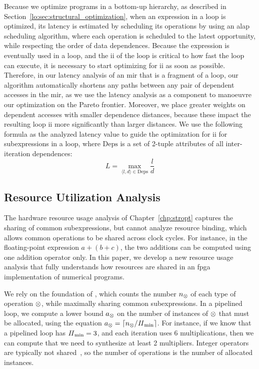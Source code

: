 Because we optimize programs in a bottom-up hierarchy, as described in
Section~\ref{lo:sec:structural_optimization}, when an expression in a loop
is optimized, its latency is estimated by scheduling its operations by using
an \gls{alap}~\cite{wang_hls} scheduling algorithm, where each operation
is scheduled to the latest opportunity, while respecting the order of data
dependences.  Because the expression is eventually used in a loop, and the
\gls{ii} of the loop is critical to how fast the loop can execute, it is
necessary to start optimizing for \gls{ii} as soon as possible. Therefore,
in our latency analysis of an \gls{mir} that is a fragment of a loop, our
algorithm automatically shortens any paths between any pair of dependent
accesses in the \gls{mir}\@, as we use the latency analysis as a component to
manoeuvre our optimization on the Pareto frontier.  Moreover, we place greater
weights on dependent accesses with smaller dependence distances, because these
impact the resulting loop \gls{ii} more significantly than larger distances.
We use the following formula as the analyzed latency value to guide the
optimization for \gls{ii} for subexpressions in a loop, where $\mathrm{Deps}$
is a set of 2-tuple attributes of all inter-iteration dependences:
\begin{equation}
    L = \max_{\langle l, d \rangle \in \mathrm{Deps}} \frac{l}{d}
\end{equation}

\subsection{Resource Utilization Analysis}
\label{lo:sub:resource_utilization_analysis}

The hardware resource usage analysis of Chapter~\ref{chp:stropt} captures the
sharing of common subexpressions, but cannot analyze resource binding, which
allows common operations to be shared across clock cycles. For instance, in
the floating-point expression $a + (b + c)$, the two additions can be computed
using one addition operator only. In this paper, we develop a new resource
usage analysis that fully understands how resources are shared in an \gls{fpga}
implementation of numerical programs.

We rely on the foundation of \soap{}, which counts the number $n_\otimes$
of each type of operation $\otimes$, while maximally sharing common
subexpressions.  In a pipelined loop, we compute a lower bound $a_\otimes$
on the number of instances of $\otimes$ that must be allocated, using
the equation $a_\otimes = \lceil n_\otimes/\mathit{II}_{\rm min}\rceil$.  For instance,
if we know that a pipelined loop has $\mathit{II}_{\rm min} = 3$, and each iteration uses 6
multiplications, then we can compute that we need to synthesize at least 2
multipliers.  Integer operators are typically not shared~\cite{cong15}, so the
number of operations is the number of allocated instances.

